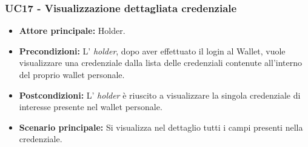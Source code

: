 \subsubsection{UC17 - Visualizzazione dettagliata credenziale}
\begin{itemize}
\item \textbf{Attore principale:} Holder.
\item \textbf{Precondizioni:} L’ \textit{holder}, dopo aver effettuato il login al Wallet, vuole visualizzare una credenziale dalla lista delle credenziali contenute all'interno del proprio wallet personale. 
\item \textbf{Postcondizioni:} L’ \textit{holder} è riuscito a visualizzare la singola credenziale di interesse presente nel wallet personale.
\item \textbf{Scenario principale:} Si visualizza nel dettaglio tutti i campi presenti nella credenziale.
\end{itemize}

